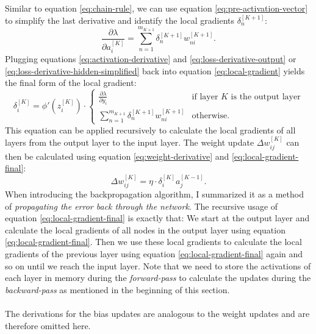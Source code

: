 Similar to equation \ref{eq:chain-rule}, we can use equation \ref{eq:pre-activation-vector} to simplify the last derivative and identify the local gradients $\delta_n^{[K+1]}$: 
\begin{equation}
    \frac{\partial \lambda}{\partial a_i^{[K]}} = \sum_{n=1}^{m_{K+1}} \delta_n^{[K+1]} w_{ni}^{[K+1]} \text{.}
    \label{eq:loss-derivative-hidden-simplified}
\end{equation}
Plugging equations \ref{eq:activation-derivative} and \ref{eq:loss-derivative-output} or \ref{eq:loss-derivative-hidden-simplified} back into equation \ref{eq:local-gradient} yields the final form of the local gradient:
\begin{equation}
    \delta_i^{[K]} = \phi'(z_i^{[K]}) \cdot \begin{cases}
         \frac{\partial \lambda}{\partial y_i} & \text{if layer } K \text{ is the output layer} \\
         \sum_{n=1}^{m_{K+1}} \delta_n^{[K+1]} w_{ni}^{[K+1]} & \text{otherwise} \text{.}
    \end{cases}
    \label{eq:local-gradient-final}
\end{equation}
This equation can be applied recursively to calculate the local gradients of all layers from the output layer to the input layer.
The weight update $\Delta w_{ij}^{[K]}$ can then be calculated using equation \ref{eq:weight-derivative} and \ref{eq:local-gradient-final}:
\begin{equation}
    \Delta w_{ij}^{[K]} = \eta \cdot \delta_i^{[K]} a_j^{[K-1]} \text{.}
    \label{eq:weight-update}
\end{equation}
When introducing the backpropagation algorithm, I summarized it as a method of \textit{propagating the error back through the network}.
The recursive usage of equation \ref{eq:local-gradient-final} is exactly that: We start at the output layer and calculate the local gradients of all nodes in the output layer using equation \ref{eq:local-gradient-final}.
Then we use these local gradients to calculate the local gradients of the previous layer using equation \ref{eq:local-gradient-final} again and so on until we reach the input layer.
Note that we need to store the activations of each layer in memory during the \textit{forward-pass} to calculate the updates during the \textit{backward-pass} as mentioned in the beginning of this section.
\\
\\
The derivations for the bias updates are analogous to the weight updates and are therefore omitted here.
